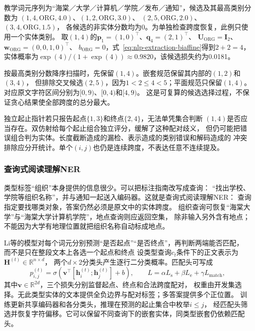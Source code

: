 \begin{example}[嵌套候选怎样保留]
\label{ex:nlp-extraction-nested}
教学词元序列为“海棠／大学／计算机／学院／发布／通知”，候选及其最高类别分数为
$(1,4,\mathrm{ORG},4.0)$、$(1,2,\mathrm{ORG},3.0)$、
$(2,5,\mathrm{ORG},2.0)$、$(3,4,\mathrm{ORG},1.5)$，
各候选的非实体分数均为0。为单独检查跨度恢复，此例只使用一个实体类别。
取$(1,4)$的$\bm{p}_1=(1,0)^\top$、$\bm{q}_4=(2,1)^\top$、
$\bm{U}_{\mathrm{ORG}}=\bm{I}_2$、$\bm{w}_{\mathrm{ORG}}=(0,0,1,0)^\top$、
$b_{\mathrm{ORG}}=0$，式~\eqref{eq:nlp-extraction-biaffine}得到$2+2=4$，
实体概率为$\exp(4)/(1+\exp(4))\approx0.9820$，该候选损失约为0.0181。

按最高类别分数降序扫描时，先保留$(1,4)$。嵌套规范保留其内部的$(1,2)$和$(3,4)$，
但排除交叉候选$(2,5)$，因为$1<2\leq4<5$；平面规范只保留$(1,4)$。
对应原文字符区间分别为$[0,9)$、$[0,4)$和$[4,9)$。
这是可复算的候选选择过程，不保证贪心结果使全部跨度的总分最大。
\end{example}

独立起止指针若只报告起点$\{1,3\}$和终点$\{2,4\}$，无法单凭集合判断
$(1,4)$是否应当存在。双仿射给每个起止组合独立评分，缓解了这种配对歧义，
但仍可能把错误组合判为实体。长度截断造成的漏检、表示造成的类别错误和解码造成的
冲突排除应分开统计。单个$(i,j)$也仍是连续跨度，不表达任意不连续提及。

\subsubsection{查询式阅读理解NER}
\label{sec:nlp-extraction-mrc-ner}

类型标签“组织”本身提供的信息很少。可以把标注指南改写成查询：
“找出学校、学院等组织名称”，并与通知一起送入编码器。这就是查询式阅读理解NER：
查询指定要找哪类对象，答案仍然必须是原文中的实体跨度。
组织查询可恢复“海棠大学”与“海棠大学计算机学院”，地点查询则应返回空集，
除非输入另外含有地点；不能因为大学有地理位置就把组织名称自动标成地点。

Li等的模型对每个词元分别预测“是否起点”“是否终点”，再判断两端能否匹配，
而不是只在整段文本上各选一个起点和终点
设类型查询$c_t$条件下的正文表示为$\bm{H}^{(t)}\in\mathbb{R}^{n\times d}$，
两个$d\times2$分类头产生逐行二分类概率。匹配头可写成
\begin{equation}
  p_{i,j}^{(t)}=\sigma\!\left(
  \bm{v}^{\top}[\bm{h}^{(t)}_i;\bm{h}^{(t)}_j]+b\right),
  \qquad
  L=\alpha L_{\mathrm{s}}+\beta L_{\mathrm{e}}+\gamma L_{\mathrm{match}},
  \label{eq:nlp-extraction-mrc}
\end{equation}
其中$\bm{v}\in\mathbb{R}^{2d}$，三个损失分别监督起点、终点和合法跨度配对，
权重由开发集选择。无此类型实体的文本提供全负边界与配对标签；多答案提供多个正位置。
训练更新共享编码器和各分类头，推理在预测的起止集合中枚举$i\leq j$，
经匹配头筛选并恢复字符偏移。它可以保留不同查询下的嵌套实体，同类型嵌套仍依赖匹配头。

